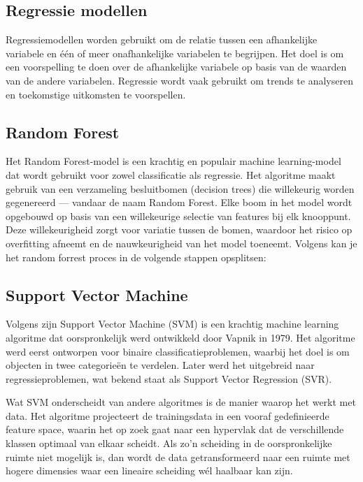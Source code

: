 \subsection{Regressie modellen}

Regressiemodellen worden gebruikt om de relatie tussen een afhankelijke variabele en één of meer onafhankelijke variabelen te begrijpen. Het doel is om een voorspelling te doen over de afhankelijke variabele op basis van de waarden van de andere variabelen. Regressie wordt vaak gebruikt om trends te analyseren en toekomstige uitkomsten te voorspellen.

\subsection*{Random Forest}
Het Random Forest-model is een krachtig en populair machine learning-model dat wordt gebruikt voor zowel classificatie als regressie. Het algoritme maakt gebruik van een verzameling besluitbomen (decision trees) die willekeurig worden gegenereerd — vandaar de naam Random Forest. Elke boom in het model wordt opgebouwd op basis van een willekeurige selectie van features bij elk knooppunt. Deze willekeurigheid zorgt voor variatie tussen de bomen, waardoor het risico op overfitting afneemt en de nauwkeurigheid van het model toeneemt. Volgens \textcite{Sekhar2016} kan je het random forrest proces in de volgende stappen opsplitsen:



\subsection*{Support Vector Machine}

Volgens \textcite{RodriguezPerez2022} zijn Support Vector Machine (SVM) is een krachtig machine learning algoritme dat oorspronkelijk werd ontwikkeld door Vapnik in 1979. Het algoritme werd eerst ontworpen voor binaire classificatieproblemen, waarbij het doel is om objecten in twee categorieën te verdelen. Later werd het uitgebreid naar regressieproblemen, wat bekend staat als Support Vector Regression (SVR).

\vspace{1em}

Wat SVM onderscheidt van andere algoritmes is de manier waarop het werkt met data. Het algoritme projecteert de trainingsdata in een vooraf gedefinieerde feature space, waarin het op zoek gaat naar een hypervlak dat de verschillende klassen optimaal van elkaar scheidt. Als zo’n scheiding in de oorspronkelijke ruimte niet mogelijk is, dan wordt de data getransformeerd naar een ruimte met hogere dimensies waar een lineaire scheiding wél haalbaar kan zijn.

